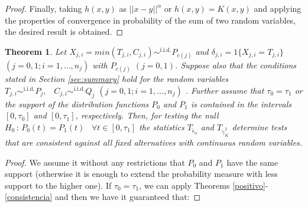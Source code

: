 \documentclass[11pt]{article}
\newtheorem{theorem}{Theorem}
\begin{document}
\begin{appendices}
\begin{proof}
	Finally, taking  $h(x,y)$ as  $||x-y||^{\alpha}$ or $h(x,y)=K(x,y)$ and applying the properties of convergence  in probability of the sum of two random variables, the desired result is obtained.
	
\end{proof}     



\begin{theorem}
		Let  $X_{j,i}= min(T_{j,i},C_{j,i})\sim^{ \text{i.i.d.}  } P_{c(j)} $ and  $\delta_{j,i}= 1\{X_{j,i}= T_{j,i}\}$	$(j=0,1; i=1,\dots,n_j)$ with $P_{c(j)}$ $(j=0,1)$. Suppose also that  the conditions  stated in Section \ref{sec:summary} hold  for the random variables  $T_{j,i}\sim^{ \text{i.i.d.}  }  P_{j},\,\,\,\,\,C_{j,i} \sim^{ \text{i.i.d.}  }  Q_{j}$ $(j=0,1; i=1,\dots,n_j)$ . Further assume that $\tau_0=\tau_1$  or the  support of the distribution functions $P_0$ and $P_1$ is  contained in the intervals $ [0,\tau_0] $ and $[0,\tau_1]$, respectively. Then, 
	for testing the null  $H_0  \,:\, P_{0}(t)  =  P_{1}(t) \,\,\,\,\,\forall  t\in [0,\tau_1] $	
	the statistics $T_{\tilde{\epsilon}_\alpha}$ and   $T_{\tilde{\gamma}_K^{2}}$  determine tests that are consistent against all fixed  alternatives with continuous random variables.

	
\end{theorem}

\begin{proof}
	
	
	
	We assume it without any restrictions that $P_0$ and $ P_1$ have the same support (otherwise it is enough to extend the probability measure with less support to the higher one). If $\tau_0= \tau_1$, we can  apply Theorems \ref{positivo}-\ref{consistencia} and then we have it guaranteed that:
	

\end{proof}
\end{appendices}
\end{document}
